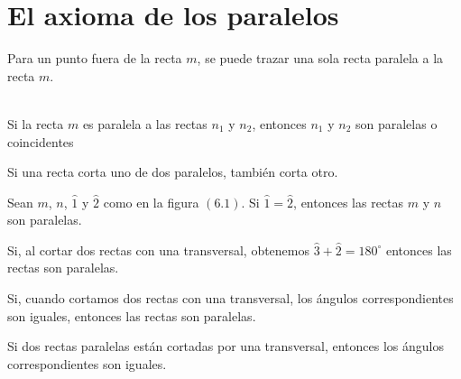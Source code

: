 \chapter{El axioma de los paralelos}

\setcounter{part}{5}

\begin{axioma}
    Para un punto fuera de la recta $m$, se puede trazar una sola recta paralela a la recta $m$.\\\\    
\end{axioma}

	    \begin{proposicion}
		Si la recta $m$ es paralela a las rectas $n_1$ y $n_2$, entonces $n_1$ y $n_2$ son paralelas o coincidentes\\
	    \end{proposicion}

	\begin{cor}
	    Si una recta corta uno de dos paralelos, también corta otro.\\
	\end{cor}

	    \begin{proposicion}
		Sean $m$, $n$, $\widehat{1}$ y $\widehat{2}$ como en la figura $(6.1)$. Si $\widehat{1} = \widehat{2}$, entonces las rectas $m$ y $n$ son paralelas.\\
	    \end{proposicion}

	    \begin{proposicion}
		Si, al cortar dos rectas con una transversal, obtenemos $\widehat{3} + \widehat{2} = 180^{\circ}$ entonces las rectas son paralelas.\\
	    \end{proposicion}

	    \begin{proposicion}
		Si, cuando cortamos dos rectas con una transversal, los ángulos correspondientes son iguales, entonces las rectas son paralelas.\\
	    \end{proposicion}

	    \begin{proposicion}
		Si dos rectas paralelas están cortadas por una transversal, entonces los ángulos correspondientes son iguales.\\
	    \end{proposicion}

